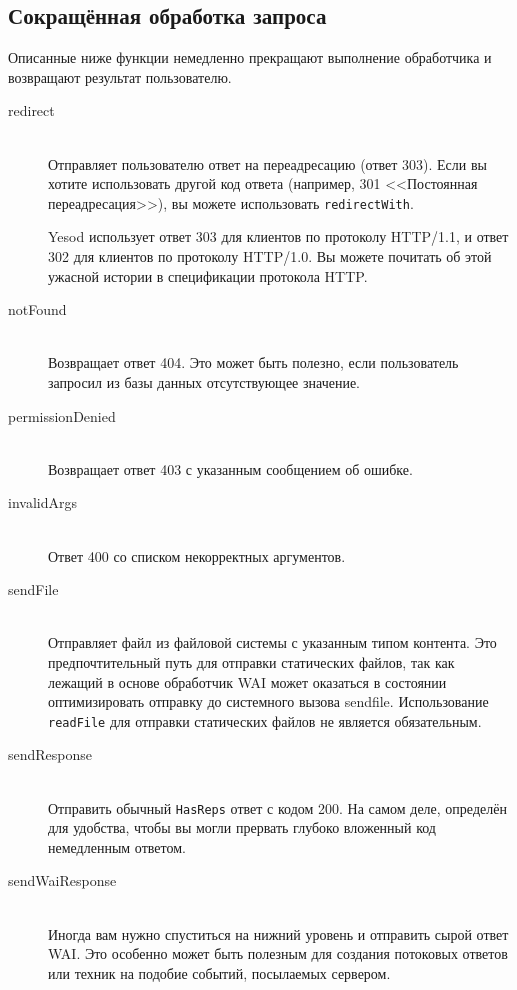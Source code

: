 \subsection{Сокращённая обработка запроса}
Описанные ниже функции немедленно прекращают выполнение обработчика и
возвращают результат пользователю.
\begin{description}
\item[redirect] \hfill \\
Отправляет пользователю ответ на переадресацию (ответ 303). Если вы
хотите использовать другой код ответа (например, 301 <<Постоянная
переадресация>>), вы можете использовать \lstinline!redirectWith!.
\begin{remark}
Yesod использует ответ 303 для клиентов по протоколу HTTP/1.1, и ответ
302 для клиентов по протоколу HTTP/1.0. Вы можете почитать об этой
ужасной истории в спецификации протокола HTTP.
\end{remark}

\item[notFound] \hfill \\
Возвращает ответ 404. Это может быть полезно, если пользователь
запросил из базы данных отсутствующее значение.

\item[permissionDenied] \hfill \\
Возвращает ответ 403 с указанным сообщением об ошибке.

\item[invalidArgs] \hfill \\
Ответ 400 со списком некорректных аргументов.

\item[sendFile] \hfill \\
Отправляет файл из файловой системы с указанным типом контента. Это
предпочтительный путь для отправки статических файлов, так как лежащий
в основе обработчик WAI может оказаться в состоянии оптимизировать
отправку до системного вызова sendfile. Использование
\lstinline!readFile! для отправки статических файлов не является
обязательным.

\item[sendResponse] \hfill \\
Отправить обычный \lstinline!HasReps! ответ с кодом 200. На самом
деле, определён для удобства, чтобы вы могли прервать глубоко
вложенный код немедленным ответом.

\item[sendWaiResponse] \hfill \\
Иногда вам нужно спуститься на нижний уровень и отправить сырой ответ
WAI. Это особенно может быть полезным для создания потоковых ответов
или техник на подобие событий, посылаемых сервером.
\end{description}

